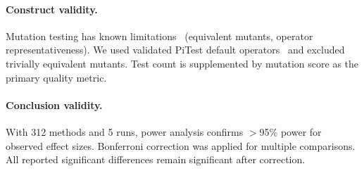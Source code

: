 \paragraph{Construct validity.} Mutation testing has known limitations~\cite{papadakis2019mutation} (equivalent mutants, operator representativeness). We used validated PiTest default operators~\cite{coles2016pitest} and excluded trivially equivalent mutants. Test count is supplemented by mutation score as the primary quality metric.

\paragraph{Conclusion validity.} With 312 methods and 5 runs, power analysis confirms $>$95\% power for observed effect sizes. Bonferroni correction was applied for multiple comparisons. All reported significant differences remain significant after correction.
